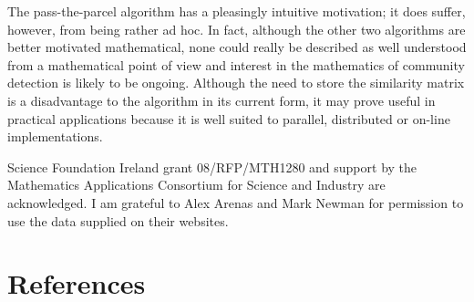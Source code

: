 \documentclass[12pt]{iopart}
\begin{document}
The pass-the-parcel algorithm has a pleasingly intuitive motivation;
it does suffer, however, from being rather ad hoc. In fact, although
the other two algorithms are better motivated mathematical, none could
really be described as well understood from a mathematical point of
view and interest in the mathematics of community detection is likely
to be ongoing. Although the need to store the similarity matrix is a
disadvantage to the algorithm in its current form, it may prove useful
in practical applications because it is well suited to parallel,
distributed or on-line implementations.

Science Foundation Ireland grant 08/RFP/MTH1280 and support by the
Mathematics Applications Consortium for Science and Industry are
acknowledged. I am grateful to Alex Arenas and Mark Newman for
permission to use the data supplied on their websites.

\section*{References}



\end{document}
